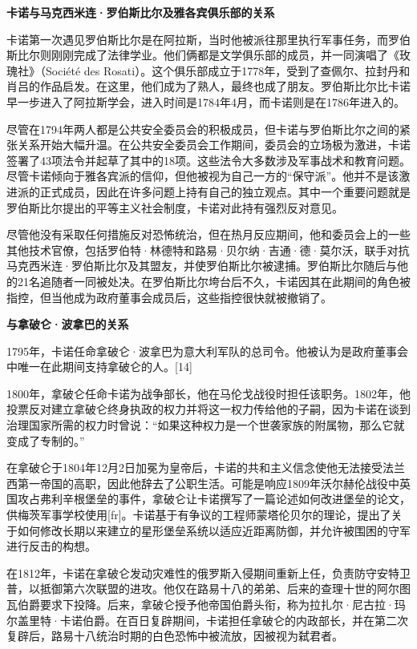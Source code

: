 \textbf{卡诺与马克西米连·罗伯斯比尔及雅各宾俱乐部的关系 } 

卡诺第一次遇见罗伯斯比尔是在阿拉斯，当时他被派往那里执行军事任务，而罗伯斯比尔则刚刚完成了法律学业。他们俩都是文学俱乐部的成员，并一同演唱了《玫瑰社》（Société des Rosati）。这个俱乐部成立于1778年，受到了查佩尔、拉封丹和肖吕的作品启发。在这里，他们成为了熟人，最终也成了朋友。罗伯斯比尔比卡诺早一步进入了阿拉斯学会，进入时间是1784年4月，而卡诺则是在1786年进入的。

尽管在1794年两人都是公共安全委员会的积极成员，但卡诺与罗伯斯比尔之间的紧张关系开始大幅升温。在公共安全委员会工作期间，委员会的立场极为激进，卡诺签署了43项法令并起草了其中的18项。这些法令大多数涉及军事战术和教育问题。尽管卡诺倾向于雅各宾派的信仰，但他被视为自己一方的“保守派”。他并不是该激进派的正式成员，因此在许多问题上持有自己的独立观点。其中一个重要问题就是罗伯斯比尔提出的平等主义社会制度，卡诺对此持有强烈反对意见。

尽管他没有采取任何措施反对恐怖统治，但在热月反应期间，他和委员会上的一些其他技术官僚，包括罗伯特·林德特和路易·贝尔纳·吉通·德·莫尔沃，联手对抗马克西米连·罗伯斯比尔及其盟友，并使罗伯斯比尔被逮捕。罗伯斯比尔随后与他的21名追随者一同被处决。在罗伯斯比尔垮台后不久，卡诺因其在此期间的角色被指控，但当他成为政府董事会成员后，这些指控很快就被撤销了。

\textbf{与拿破仑·波拿巴的关系}  

1795年，卡诺任命拿破仑·波拿巴为意大利军队的总司令。他被认为是政府董事会中唯一在此期间支持拿破仑的人。[14]  

1800年，拿破仑任命卡诺为战争部长，他在马伦戈战役时担任该职务。1802年，他投票反对建立拿破仑终身执政的权力并将这一权力传给他的子嗣，因为卡诺在谈到治理国家所需的权力时曾说：“如果这种权力是一个世袭家族的附属物，那么它就变成了专制的。”

在拿破仑于1804年12月2日加冕为皇帝后，卡诺的共和主义信念使他无法接受法兰西第一帝国的高职，因此他辞去了公职生活。可能是响应1809年沃尔赫伦战役中英国攻占弗利辛根堡垒的事件，拿破仑让卡诺撰写了一篇论述如何改进堡垒的论文，供梅茨军事学校使用[fr]。卡诺基于有争议的工程师蒙塔伦贝尔的理论，提出了关于如何修改长期以来建立的星形堡垒系统以适应近距离防御，并允许被围困的守军进行反击的构想。

在1812年，卡诺在拿破仑发动灾难性的俄罗斯入侵期间重新上任，负责防守安特卫普，以抵御第六次联盟的进攻。他仅在路易十八的弟弟、后来的查理十世的阿尔图瓦伯爵要求下投降。后来，拿破仑授予他帝国伯爵头衔，称为拉扎尔·尼古拉·玛尔盖里特·卡诺伯爵。在百日复辟期间，卡诺担任拿破仑的内政部长，并在第二次复辟后，路易十八统治时期的白色恐怖中被流放，因被视为弑君者。
